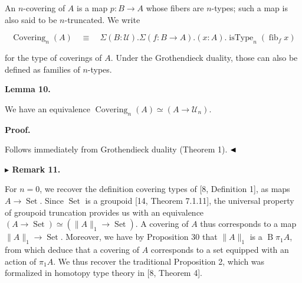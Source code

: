  
 
An $n$-covering of $A$ is a map $p:B\to A$ whose fibers are $n$-types; such a map is also said to be $n$-truncated. We write\par
  
\par  \quad  \[\operatorname{Covering}_{n}(A)\quad\equiv\quad\Sigma(B:\mathcal{U}).\Sigma(f:B\to A).(x:A).\operatorname{isType}_{n}(\operatorname{fib}_{f}x)\]\quad  \quad  
  
for the type of coverings of $A$. Under the Grothendieck duality, those can also be defined as families of $n$-types.\par
 
 
 
\par\medskip\noindent\textbf{Lemma 10.}\par
 
 
We have an equivalence $\operatorname{Covering}_{n}(A)\simeq(A\to\mathcal{U}_{n})$.\par
 
 
 
 
\par\medskip\noindent\textbf{Proof.}\par
 
 
Follows immediately from Grothendieck duality (Theorem 1). $\hfill\blacktriangleleft$\par
 
 
 
\par\medskip\noindent\textbf{$\blacktriangleright$ Remark 11.}\par
 
 
For $n=0$, we recover the definition covering types of [8, Definition 1], as maps $A\to\operatorname{Set}$. Since $\operatorname{Set}$ is a groupoid [14, Theorem 7.1.11], the universal property of groupoid truncation provides us with an equivalence $(A\to\operatorname{Set})\simeq(\|A\|_{1}\to\operatorname{Set})$. A covering of $A$ thus corresponds to a map $\|A\|_{1}\to\operatorname{Set}$. Moreover, we have by Proposition 30 that $\|A\|_{1}$ is a $\operatorname{B}\pi_{1}A$, from which deduce that a covering of $A$ corresponds to a set equipped with an action of $\pi_{1}A$. We thus recover the traditional Proposition 2, which was formalized in homotopy type theory in [8, Theorem 4].\par
 
